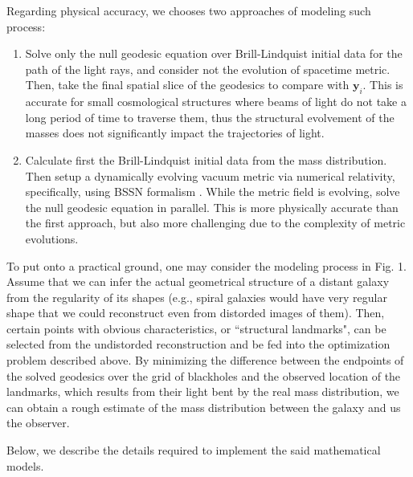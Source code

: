 \documentclass[conference]{IEEEtran}
\begin{document}
Regarding physical accuracy, we chooses two approaches of 
modeling such process:
\begin{enumerate}
    \item Solve only the null geodesic equation over Brill-Lindquist
    initial data \cite{BLID} for the path of 
    the light rays, and consider not the evolution of spacetime metric. 
    Then, take the final spatial slice of the geodesics to compare with 
    $\mathbf{y}_i$. This is accurate for small cosmological structures 
    where beams of light do not take a long period of time to traverse 
    them, thus the structural evolvement of the masses does not 
    significantly impact the trajectories of light. 
    \item Calculate first the Brill-Lindquist initial data from the 
    mass distribution. Then setup a dynamically evolving vacuum metric 
    via numerical relativity, specifically, using BSSN 
    formalism \cite{BSSN}. While the metric field is evolving, solve the 
    null geodesic equation in parallel. This is more physically accurate 
    than the first approach, but also more challenging due to the 
    complexity of metric evolutions. 
\end{enumerate}

To put onto a practical ground, one may consider the modeling process in Fig. 1.
Assume that we can infer the actual geometrical structure of a distant galaxy 
from the regularity of its shapes (e.g., spiral galaxies would have very 
regular shape that we could reconstruct even from distorded images of them). Then, 
certain points with obvious characteristics, or ``structural landmarks", can be 
selected from the undistorded reconstruction and be fed into the optimization problem 
described above. By minimizing the difference between the endpoints of the solved geodesics over the 
grid of blackholes and the observed location of the landmarks, which results from their light bent 
by the real mass distribution, we can obtain a rough estimate of the mass distribution 
between the galaxy and us the observer. 

Below, we describe the details required to implement the said mathematical models.
\end{document}

